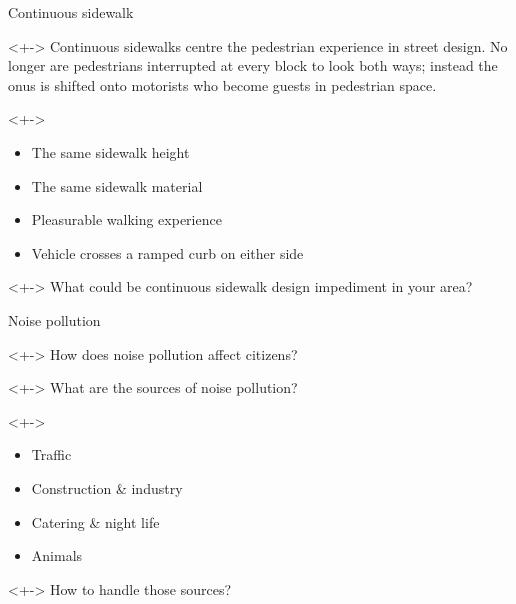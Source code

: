 \documentclass{beamer}
\begin{document}
    \begin{frame}{Continuous sidewalk}
        \begin{block}
            <+->{}
            Continuous sidewalks centre the pedestrian experience in street design. No longer are pedestrians interrupted at every block to look both ways; instead the onus is shifted onto motorists who become guests in pedestrian space.
        \end{block}
        \begin{block}
            <+->{}
            \begin{itemize}
                \item The same sidewalk height
                \item The same sidewalk material
                \item Pleasurable walking experience
                \item Vehicle crosses a ramped curb on either side
            \end{itemize}
        \end{block}
        \begin{block}
            <+->{}
            What could be continuous sidewalk design impediment in your area?
        \end{block}
    \end{frame}

    \begin{frame}{Noise pollution}
        \begin{block}
            <+->{}
            How does noise pollution affect citizens?
        \end{block}
        \begin{block}
            <+->{}
            What are the sources of noise pollution?
        \end{block}
        \begin{block}
            <+->{}
            \begin{itemize}
                \item Traffic
                \item Construction \& industry
                \item Catering \& night life
                \item Animals
            \end{itemize}
        \end{block}
        \begin{block}
            <+->{}
            How to handle those sources?
        \end{block}
    \end{frame}
\end{document}

